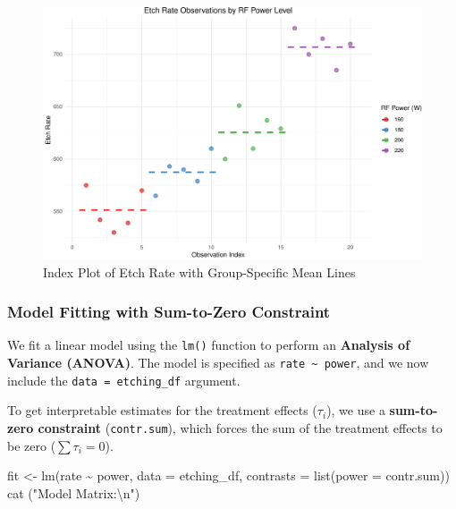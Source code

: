 \documentclass[
  letterpaper,
]{scrbook}
\newenvironment{Shaded}{\begin{snugshade}}{\end{snugshade}}
\newcommand{\AttributeTok}[1]{\textcolor[rgb]{0.40,0.45,0.13}{#1}}
\newcommand{\FunctionTok}[1]{\textcolor[rgb]{0.28,0.35,0.67}{#1}}
\newcommand{\NormalTok}[1]{\textcolor[rgb]{0.00,0.23,0.31}{#1}}
\newcommand{\OtherTok}[1]{\textcolor[rgb]{0.00,0.23,0.31}{#1}}
\newcommand{\SpecialCharTok}[1]{\textcolor[rgb]{0.37,0.37,0.37}{#1}}
\newcommand{\StringTok}[1]{\textcolor[rgb]{0.13,0.47,0.30}{#1}}
\begin{document}
\begin{figure}[H]

{\centering \includegraphics{unit5-factor/crbd_files/figure-pdf/index-plot-rate-power-segments-1.pdf}

}

\caption{Index Plot of Etch Rate with Group-Specific Mean Lines}

\end{figure}%

\subsubsection{Model Fitting with Sum-to-Zero
Constraint}\label{model-fitting-with-sum-to-zero-constraint}

We fit a linear model using the \texttt{lm()} function to perform an
\textbf{Analysis of Variance (ANOVA)}. The model is specified as
\texttt{rate\ \textasciitilde{}\ power}, and we now include the
\texttt{data\ =\ etching\_df} argument.

To get interpretable estimates for the treatment effects (\(\tau_i\)),
we use a \textbf{sum-to-zero constraint} (\texttt{contr.sum}), which
forces the sum of the treatment effects to be zero
(\(\sum \tau_i = 0\)).

\begin{Shaded}
\begin{Highlighting}[]
\NormalTok{fit }\OtherTok{\textless{}{-}} \FunctionTok{lm}\NormalTok{(rate }\SpecialCharTok{\textasciitilde{}}\NormalTok{ power, }\AttributeTok{data =}\NormalTok{ etching\_df, }\AttributeTok{contrasts =} \FunctionTok{list}\NormalTok{(}\AttributeTok{power =}\NormalTok{ contr.sum))}
\FunctionTok{cat}\NormalTok{ (}\StringTok{"Model Matrix:}\SpecialCharTok{\textbackslash{}n}\StringTok{"}\NormalTok{)}
\end{Highlighting}
\end{Shaded}
\end{document}
